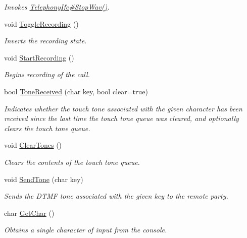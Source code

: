 \begin{CompactItemize}
\begin{CompactList}\small\item\em Invokes \hyperlink{}{TelephonyIfc\#StopWav()}. \item\end{CompactList}\item 
void \hyperlink{classTeleKarma_e5de07b5de99a85c3703be973e7230df}{ToggleRecording} ()
\begin{CompactList}\small\item\em Inverts the recording state. \item\end{CompactList}\item 
void \hyperlink{classTeleKarma_724b39dce3dd92f25a7de9e4a39ccfa7}{StartRecording} ()
\begin{CompactList}\small\item\em Begins recording of the call. \item\end{CompactList}\item 
bool \hyperlink{classTeleKarma_2799e28d5e0736a0149c5a212b24e6c0}{ToneReceived} (char key, bool clear=true)
\begin{CompactList}\small\item\em Indicates whether the touch tone associated with the given character has been received since the last time the touch tone queue was cleared, and optionally clears the touch tone queue. \item\end{CompactList}\item 
void \hyperlink{classTeleKarma_5d1ced337173e7260efdb3f13fe54bf9}{ClearTones} ()
\begin{CompactList}\small\item\em Clears the contents of the touch tone queue. \item\end{CompactList}\item 
void \hyperlink{classTeleKarma_85b9f9bf83876f3fa9cc326a7124f6d5}{SendTone} (char key)
\begin{CompactList}\small\item\em Sends the DTMF tone associated with the given key to the remote party. \item\end{CompactList}\item 
char \hyperlink{classTeleKarma_5dd175d49c7a2f9f36ff9c3c7c34d230}{GetChar} ()
\begin{CompactList}\small\item\em Obtains a single character of input from the console. \item\end{CompactList}\item 

\end{CompactItemize}
